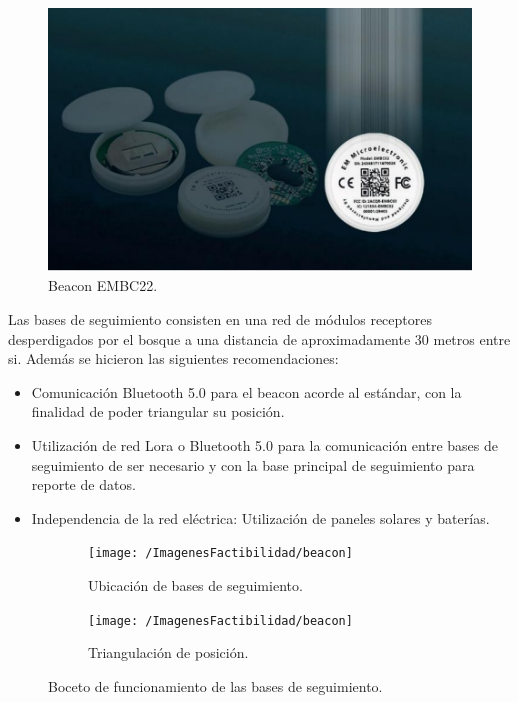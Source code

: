 \begin{figure}[H]
	\centering
	\includegraphics[width=\linewidth]{ImagenesFactibilidad/beaconpic}
	\caption{Beacon EMBC22.}
	\label{fig:beacon}
\end{figure}
Las bases de seguimiento consisten en una red de módulos receptores desperdigados por el bosque a una distancia de aproximadamente 30 metros entre si.
Además se hicieron las siguientes recomendaciones:
\begin{itemize}
\item Comunicación Bluetooth 5.0 para el beacon acorde al estándar, con la finalidad de poder triangular su posición.
\item Utilización de red Lora o Bluetooth 5.0 para la comunicación entre bases de seguimiento de ser necesario y con la base principal de seguimiento para reporte de datos.
\item Independencia de la red eléctrica: Utilización de paneles solares y baterías.
\end{itemize}
\begin{figure}[H]
\begin{subfigure}{.5\textwidth}
  \centering
  \texttt{[image: /ImagenesFactibilidad/beacon]}
  \caption{Ubicación de bases de seguimiento.}
  \label{fig:sfig1}
\end{subfigure}%
\begin{subfigure}{.5\textwidth}
  \centering
  \texttt{[image: /ImagenesFactibilidad/beacon]}
  \caption{Triangulación de posición.}
  \label{fig:sfig2}
\end{subfigure}%
\caption{Boceto de funcionamiento de las bases de seguimiento.}
\label{fig:fig}
\end{figure}
